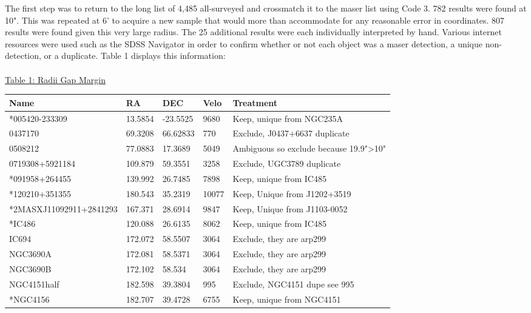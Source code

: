 \documentclass[12pt]{article}
\begin{document}
The first step was to return to the long list of 4,485 all-surveyed and crossmatch it to the maser list using Code 3. 782 results were found at 10". This was repeated at 6' to acquire a new sample that would more than accommodate for any reasonable error in coordinates. 807 results were found given this very large radius. The 25 additional results were each individually interpreted by hand. Various internet resources were used such as the SDSS Navigator\cite{navigator} in order to confirm whether or not each object was a maser detection, a unique non-detection, or a duplicate. Table 1 displays this information:\\
\\
\underline{Table 1: Radii Gap Margin}\\
{\scriptsize \begin{tabular}{|p{3.7cm}|p{1cm}|p{1.1cm}|p{0.6cm}|p{8cm}|}
  \hline
\normalsize Name & \normalsize RA & \normalsize DEC & \normalsize Velo & \normalsize Treatment \\
 \hline 
 \hline
*005420-233309 & 13.5854 & -23.5525 & 9680 & Keep, unique from NGC235A \\ \hline
0437170 & 69.3208 & 66.62833 & 770 & Exclude, J0437+6637 duplicate \\ \hline
0508212 & 77.0883 & 17.3689 & 5049 & Ambiguous so exclude because 19.9">10" \\ \hline
0719308+5921184 & 109.879 & 59.3551 & 3258 & Exclude, UGC3789 duplicate \\ \hline
*091958+264455 & 139.992 & 26.7485 & 7898 & Keep, unique from IC485 \\ \hline
*120210+351355 & 180.543 & 35.2319 & 10077 & Keep, Unique from J1202+3519 \\ \hline
*2MASXJ11092911+2841293 & 167.371 & 28.6914 & 9847 & Keep, Unique from J1103-0052 \\ \hline
*IC486 & 120.088 & 26.6135 & 8062 & Keep, unique from IC485 \\ \hline
IC694 & 172.072 & 58.5507 & 3064 & Exclude, they are arp299 \\ \hline
NGC3690A & 172.081 & 58.5371 & 3064 & Exclude, they are arp299 \\ \hline
NGC3690B & 172.102 & 58.534 & 3064 & Exclude, they are arp299 \\ \hline
NGC4151half & 182.598 & 39.3804 & 995 & Exclude, NGC4151 dupe see 995 \\ \hline
*NGC4156 & 182.707 & 39.4728 & 6755 & Keep, unique from NGC4151 \\ \hline

\end{tabular}}
\end{document}

